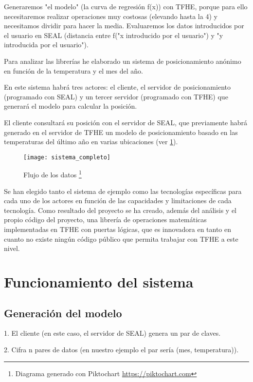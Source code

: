 Generaremos "el modelo" (la curva de regresión f(x)) con TFHE, porque para ello necesitaremos realizar operaciones muy costosas (elevando hasta la 4) y necesitamos dividir para hacer la media. Evaluaremos los datos introducidos por el usuario en SEAL (distancia entre f("x introducido por el usuario") y "y introducida por el usuario").
\fi

Para analizar las librerías he elaborado un sistema de posicionamiento anónimo en función de la temperatura y el mes del año.

En este sistema habrá tres actores: el cliente, el servidor de posicionamiento (programado con SEAL) y un tercer servidor (programado con TFHE) que generará el modelo para calcular la posición.

El cliente consultará su posición con el servidor de SEAL, que previamente habrá generado en el servidor de TFHE un modelo de posicionamiento basado en las temperaturas del último año en varias ubicaciones (ver \ref{fig:sistema_completo}).


\begin{figure}[h]
\caption{Flujo de los datos \footnote{Diagrama generado con Piktochart \url{https://piktochart.com}}}
\label{fig:sistema_completo}
\texttt{[image: sistema\_completo]}
\end{figure}


Se han elegido tanto el sistema de ejemplo como las tecnologías específicas para cada uno de los actores en función de las capacidades y limitaciones de cada tecnología. Como resultado del proyecto se ha creado, además del análisis y el propio código del proyecto, una librería de operaciones matemáticas implementadas en TFHE\cite{tfhe-math} con puertas lógicas, que es innovadora en tanto en cuanto no existe ningún código público que permita trabajar con TFHE a este nivel.

\section{Funcionamiento del sistema}


\subsection{Generación del modelo}

1. El cliente (en este caso, el servidor de SEAL) genera un par de claves.

2. Cifra n pares de datos (en nuestro ejemplo el par sería (mes, temperatura)).

